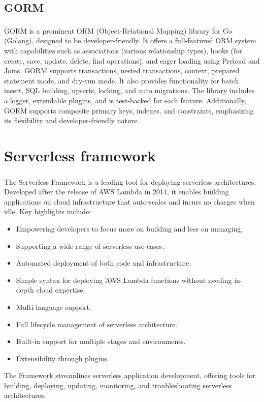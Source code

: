 \subsection{GORM}
GORM\textsuperscript{\cite{tech_12}} is a prominent ORM (Object-Relational Mapping) library for Go
(Golang), designed to be developer-friendly. It offers a full-featured ORM system with capabilities
such as associations (various relationship types), hooks (for create, save, update, delete, find
operations), and eager loading using Preload and Joins. GORM supports transactions, nested
transactions, context, prepared statement mode, and dry-run mode. It also provides functionality for
batch insert, SQL building, upserts, locking, and auto migrations. The library includes a logger,
extendable plugins, and is test-backed for each feature. Additionally, GORM supports composite
primary keys, indexes, and constraints, emphasizing its flexibility and developer-friendly nature.

\section{Serverless framework}
The Serverless Framework\textsuperscript{\cite{tech_13}} is a leading tool for deploying serverless
architectures. Developed after the release of AWS Lambda in 2014, it enables building applications
on cloud infrastructure that auto-scales and incurs no charges when idle. Key highlights include:

\begin{itemize}
    \item Empowering developers to focus more on building and less on managing.
    \item Supporting a wide range of serverless use-cases.
    \item Automated deployment of both code and infrastructure.
    \item Simple syntax for deploying AWS Lambda functions without needing in-depth cloud expertise.
    \item Multi-language support.
    \item Full lifecycle management of serverless architecture.
    \item Built-in support for multiple stages and environments.
    \item Extensibility through plugins.
\end{itemize}

The Framework streamlines serverless application development, offering tools for building,
deploying, updating, monitoring, and troubleshooting serverless architectures.

